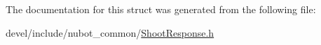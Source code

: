 The documentation for this struct was generated from the following file\-:\begin{DoxyCompactItemize}
\item 
devel/include/nubot\-\_\-common/\hyperlink{ShootResponse_8h}{Shoot\-Response.\-h}\end{DoxyCompactItemize}
